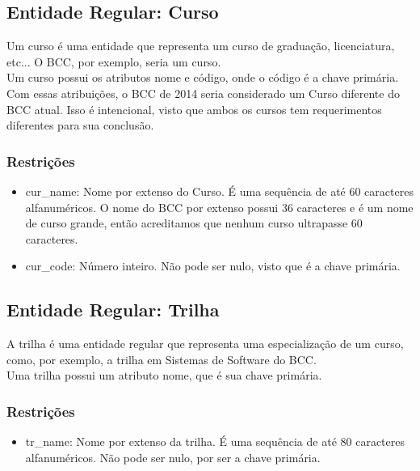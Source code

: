 \documentclass{article}
\begin{document}
    \subsection{Entidade Regular: Curso}
        \quad Um curso é uma entidade que representa um curso de graduação, licenciatura, etc... O BCC, por exemplo, seria um curso. \\
        \quad Um curso possui os atributos nome e código, onde o código é a chave primária. Com essas atribuições, o BCC de 2014 seria considerado um Curso diferente do BCC atual. Isso é intencional, visto que ambos os cursos tem requerimentos diferentes para sua conclusão.
        \subsubsection{Restrições}
            \begin{itemize}
                \item cur\_name: Nome por extenso do Curso. É uma sequência de até 60 caracteres alfanuméricos. O nome do BCC por extenso possui 36 caracteres e é um nome de curso grande, então acreditamos que nenhum curso ultrapasse 60 caracteres.
                \item cur\_code: Número inteiro. Não pode ser nulo, visto que é a chave primária.
          \end{itemize}
    
    \subsection{Entidade Regular: Trilha}
        \quad A trilha é uma entidade regular que representa uma especialização de um curso, como, por exemplo, a trilha em Sistemas de Software do BCC. \\
        \quad Uma trilha possui um atributo nome, que é sua chave primária.
        \subsubsection{Restrições}
            \begin{itemize}
                \item tr\_name: Nome por extenso da trilha. É uma sequência de até 80 caracteres alfanuméricos. Não pode ser nulo, por ser a chave primária.
          \end{itemize}
          
\end{document}
